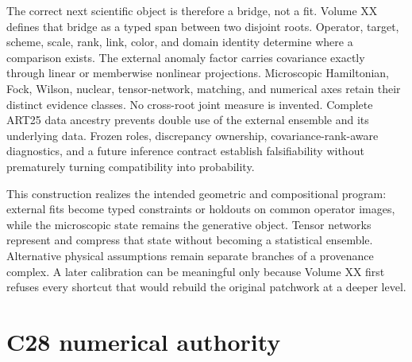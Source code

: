 \documentclass[11pt]{article}
\begin{document}
The correct next scientific object is therefore a bridge, not a fit.  Volume XX defines that bridge as a typed span between two disjoint roots.  Operator, target, scheme, scale, rank, link, color, and domain identity determine where a comparison exists.  The external anomaly factor carries covariance exactly through linear or memberwise nonlinear projections.  Microscopic Hamiltonian, Fock, Wilson, nuclear, tensor-network, matching, and numerical axes retain their distinct evidence classes.  No cross-root joint measure is invented.  Complete ART25 data ancestry prevents double use of the external ensemble and its underlying data.  Frozen roles, discrepancy ownership, covariance-rank-aware diagnostics, and a future inference contract establish falsifiability without prematurely turning compatibility into probability.

This construction realizes the intended geometric and compositional program: external fits become typed constraints or holdouts on common operator images, while the microscopic state remains the generative object.  Tensor networks represent and compress that state without becoming a statistical ensemble.  Alternative physical assumptions remain separate branches of a provenance complex.  A later calibration can be meaningful only because Volume XX first refuses every shortcut that would rebuild the original patchwork at a deeper level.

\appendix

\section{C28 numerical authority}
\label{app:c28}
\end{document}
